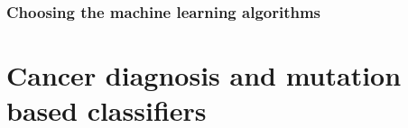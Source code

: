 

\subsubsection{Choosing the machine learning algorithms}

\section{Cancer diagnosis and mutation based classifiers}\label{discussion:diagnosis}

